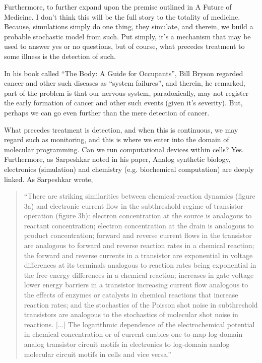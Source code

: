 Furthermore, to further expand upon the premise outlined in A Future of Medicine. I don't think this will be the full story to the totality of medicine. Because, simulations simply do one thing, they simulate, and therein, we build a probable stochastic model from such. Put simply, it's a mechanism that may be used to answer yes or no questions, but of course, what precedes treatment to some illness is the detection of such. 

In his book called ``The Body: A Guide for Occupants'', Bill Bryson regarded cancer and other such diseases as ``system failures'', and therein, he remarked, part of the problem is that our nervous system, paradoxically, may not register the early formation of cancer and other such events (given it's severity). But, perhaps we can go even further than the mere detection of cancer.

What precedes treatment is detection, and when this is continuous, we may regard such as monitoring, and this is where we enter into the domain of molecular programming. Can we run computational devices within cells? Yes. Furthermore, as Sarpeshkar noted in his paper, Analog synthetic biology, electronics (simulation) and chemistry (e.g. biochemical computation) are deeply linked. As Sarpeshkar wrote,
\begin{quotation}
    ``There are striking similarities between chemical-reaction dynamics (figure 3a) and electronic current flow in the subthreshold regime of transistor operation (figure 3b): electron concentration at the source is analogous to reactant concentration; electron concentration at the drain is analogous to product concentration; forward and reverse current flows in the transistor are analogous to forward and reverse reaction rates in a chemical reaction; the forward and reverse currents in a transistor are exponential in voltage differences at its terminals analogous to reaction rates being exponential in the free-energy differences in a chemical reaction; increases in gate voltage lower energy barriers in a transistor increasing current flow analogous to the effects of enzymes or catalysts in chemical reactions that increase reaction rates; and the stochastics of the Poisson shot noise in subthreshold transistors are analogous to the stochastics of molecular shot noise in reactions. [...] The logarithmic dependence of the electrochemical potential in chemical concentration or of current enables one to map log-domain analog transistor circuit motifs in electronics to log-domain analog molecular circuit motifs in cells and vice versa.''
\end{quotation}

